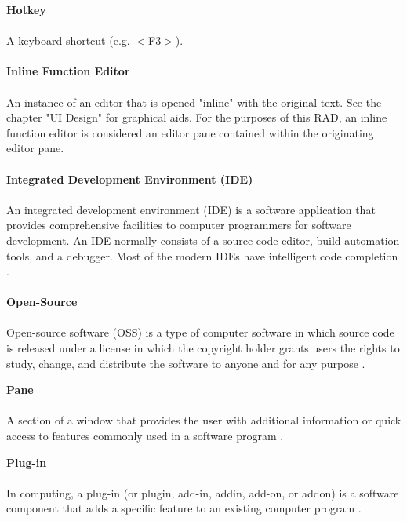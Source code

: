 \documentclass[]{report}
\begin{document}
	\noindent\textbf{Hotkey}\\ \\
	A keyboard shortcut (e.g. $<$F3$>$).\\ \\
	
	\noindent\textbf{Inline Function Editor}\\ \\
	An instance of an editor that is opened "inline" with the original text.  See the chapter "UI Design" for graphical aids.  For the purposes of this RAD, an inline function editor is considered an editor pane contained within the originating editor pane.\\ \\

	\noindent\textbf{Integrated Development Environment (IDE)}\\ \\
	An integrated development environment (IDE) is a software application that provides comprehensive facilities to computer programmers for software development. An IDE normally consists of a source code editor, build automation tools, and a debugger. Most of the modern IDEs have intelligent code completion \citep{ideWiki}.\\ \\
	
	\noindent\textbf{Open-Source}\\ \\
	Open-source software (OSS) is a type of computer software in which source code is released under a license in which the copyright holder grants users the rights to study, change, and distribute the software to anyone and for any purpose \citep{oss}.
	
	\noindent\textbf{Pane}\\ \\
	A section of a window that provides the user with additional information or quick access to features commonly used in a software program \citep{pane}.
	
	\noindent\textbf{Plug-in}\\ \\
	In computing, a plug-in (or plugin, add-in, addin, add-on, or addon) is a software component that adds a specific feature to an existing computer program \citep{plugIn}. \\ \\


\raggedright

\end{document}
